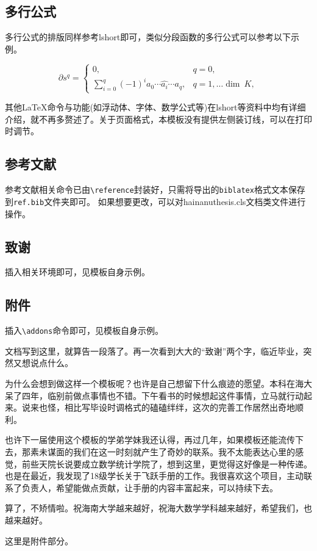 \documentclass{hainanuthesis}
\theoremstyle{definition}
\begin{document}
	\subsection{多行公式}
	
	多行公式的排版同样参考lshort即可，类似分段函数的多行公式可以参考以下示例。
	
	\[\partial s^q = \left\{
		\begin{array}{ll}
			0, & q=0,\\
			\sum\limits_{i=0}^q(-1)^i a_0\cdots \hat{a_i}\cdots a_q, &  q = 1,\dots \mathop{dim}~K,
		\end{array} \right. 
	\]
	
	其他\LaTeX 命令与功能(如浮动体、字体、数学公式等)在lshort等资料中均有详细介绍，就不再多赘述了。关于页面格式，本模板没有提供左侧装订线，可以在打印时调节。
	
	\subsection{参考文献}
	
	参考文献相关命令已由\verb|\reference|封装好，只需将导出的\verb|biblatex|格式文本保存到\verb|ref.bib|文件夹即可。
	如果想要更改，可以对hainanuthesis.cls文档类文件进行操作。
	\subsection{致谢}
	插入相关环境即可，见模板自身示例。
	
	
	
	\subsection{附件}
	
	插入\verb|\addons|命令即可，见模板自身示例。
	
	
	\newpage
	\begin{acknowledge}
		文档写到这里，就算告一段落了。再一次看到大大的“致谢”两个字，临近毕业，突然又想说点什么。
		
		为什么会想到做这样一个模板呢？也许是自己想留下什么痕迹的愿望。本科在海大呆了四年，临别前做点事情也不错。下午看书的时候想起这件事情，立马就行动起来。说来也怪，相比写毕设时调格式的磕磕绊绊，这次的完善工作居然出奇地顺利。
		
		也许下一届使用这个模板的学弟学妹我还认得，再过几年，如果模板还能流传下去，那素未谋面的我们在这一时刻就产生了奇妙的联系。我不太能表达心里的感觉，前些天院长说要成立数学统计学院了，想到这里，更觉得这好像是一种传递。也是在最近，我发现了18级学长关于飞跃手册的工作。我很喜欢这个项目，主动联系了负责人，希望能做点贡献，让手册的内容丰富起来，可以持续下去。
		
		算了，不矫情啦。祝海南大学越来越好，祝海大数学学科越来越好，希望我们，也越来越好。
	\end{acknowledge}
	
	\newpage
	
	\newpage
	\addons
	这里是附件部分。
	
	
	
	
\end{document}

